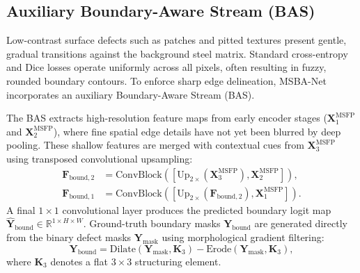 \documentclass[10pt,a4paper]{article}
\begin{document}
\subsection{Auxiliary Boundary-Aware Stream (BAS)}
Low-contrast surface defects such as patches and pitted textures present gentle, gradual transitions against the background steel matrix. Standard cross-entropy and Dice losses operate uniformly across all pixels, often resulting in fuzzy, rounded boundary contours. To enforce sharp edge delineation, MSBA-Net incorporates an auxiliary Boundary-Aware Stream (BAS).

The BAS extracts high-resolution feature maps from early encoder stages ($\mathbf{X}_1^{\text{MSFP}}$ and $\mathbf{X}_2^{\text{MSFP}}$), where fine spatial edge details have not yet been blurred by deep pooling. These shallow features are merged with contextual cues from $\mathbf{X}_3^{\text{MSFP}}$ using transposed convolutional upsampling:
\begin{align}
  \mathbf{F}_{\text{bound}, 2} &= \text{ConvBlock}\left([\text{Up}_{2\times}(\mathbf{X}_3^{\text{MSFP}}), \mathbf{X}_2^{\text{MSFP}}]\right), \\
  \mathbf{F}_{\text{bound}, 1} &= \text{ConvBlock}\left([\text{Up}_{2\times}(\mathbf{F}_{\text{bound}, 2}), \mathbf{X}_1^{\text{MSFP}}]\right).
\end{align}
A final $1\times 1$ convolutional layer produces the predicted boundary logit map $\hat{\mathbf{Y}}_{\text{bound}} \in \mathbb{R}^{1 \times H \times W}$. Ground-truth boundary masks $\mathbf{Y}_{\text{bound}}$ are generated directly from the binary defect masks $\mathbf{Y}_{\text{mask}}$ using morphological gradient filtering:
\begin{equation}
  \mathbf{Y}_{\text{bound}} = \text{Dilate}(\mathbf{Y}_{\text{mask}}, \mathbf{K}_3) - \text{Erode}(\mathbf{Y}_{\text{mask}}, \mathbf{K}_3),
\end{equation}
where $\mathbf{K}_3$ denotes a flat $3\times 3$ structuring element.
\end{document}
